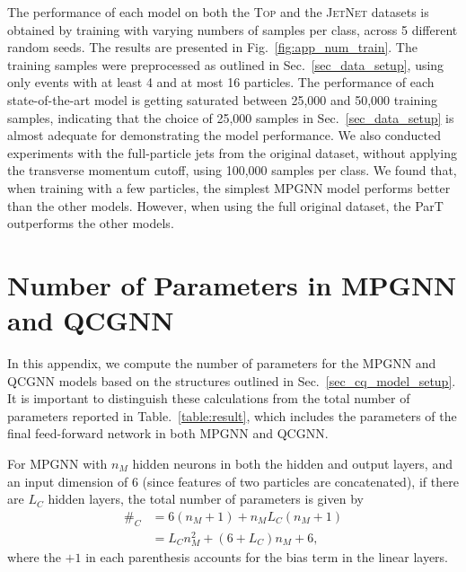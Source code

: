 \documentclass[reprint,amsmath,amssymb,prd,nofootinbib]{revtex4-2}
\newcommand{\Top}{\textsc{Top}\xspace}
\newcommand{\JetNet}{\textsc{JetNet}\xspace}
\begin{document}
The performance of each model on both the \Top and the \JetNet datasets is obtained by training with varying numbers of samples per class, across 5 different random seeds. The results are presented in Fig.~\ref{fig:app_num_train}. The training samples were preprocessed as outlined in Sec.~\ref{sec_data_setup}, using only events with at least 4 and at most 16 particles. The performance of each state-of-the-art model is getting saturated between 25,000 and 50,000 training samples, indicating that the choice of 25,000 samples in Sec.~\ref{sec_data_setup} is almost adequate for demonstrating the model performance. We also conducted experiments with the full-particle jets from the original dataset, without applying the transverse momentum cutoff, using 100,000 samples per class. We found that, when training with a few particles, the simplest MPGNN model performs better than the other models. However, when using the full original dataset, the ParT outperforms the other models.

\section{Number of Parameters in MPGNN and QCGNN} \label{app_num_param}

In this appendix, we compute the number of parameters for the MPGNN and QCGNN models based on the structures outlined in Sec.~\ref{sec_cq_model_setup}. It is important to distinguish these calculations from the total number of parameters reported in Table.~\ref{table:result}, which includes the parameters of the final feed-forward network in both MPGNN and QCGNN.

For MPGNN with $n_M$ hidden neurons in both the hidden and output layers, and an input dimension of 6 (since features of two particles are concatenated), if there are $L_C$ hidden layers, the total number of parameters is given by
\begin{equation}
    \begin{split}
        \#_C &= 6(n_M+1) + n_M L_C (n_M+1)\\
        &= L_C n^2_M + (6+L_C)n_M + 6,
    \end{split}
\end{equation}
where the $+1$ in each parenthesis accounts for the bias term in the linear layers. 
\end{document}
